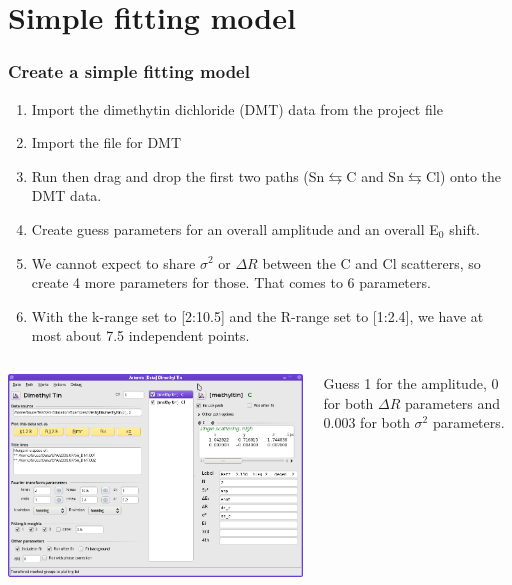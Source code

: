 \documentclass[10pt, xcolor=x11names, compress, handout]{beamer}
\begin{document}


\section{Simple fitting model}

\begin{frame}
  \frametitle{Create a simple fitting model}
  \footnotesize%
  \begin{enumerate}
  \item Import the dimethytin dichloride (DMT) data from the {\athena}
    project file
  \item Import the  file for DMT
  \item Run {\feff} then drag and drop the first two paths
    (Sn$\leftrightarrows$C and Sn$\leftrightarrows$Cl) onto the
    DMT data.
  \item Create guess parameters for an overall amplitude and an
    overall E$_0$ shift.
  \item We cannot expect to share $\sigma^2$ or $\Delta R$ 
    between the C and Cl scatterers, so create 4 more parameters for
    those.  That comes to \alert{6} {\guessp} parameters.
  \item With the k-range set to [2:10.5] and the R-range set to
    [1:2.4], we have at most about \alert{7.5} independent points.
  \end{enumerate}
  \begin{columns}
    \begin{column}{0.4\linewidth}
      \includegraphics[width=\linewidth]{images/dmt_start.png}      
    \end{column}
    \begin{column}{0.6\linewidth}
      Guess 1 for the amplitude, 0 for both $\Delta R$ parameters and
      0.003 for both $\sigma^2$ parameters.
    \end{column}
  \end{columns}
\end{frame}
\end{document}
